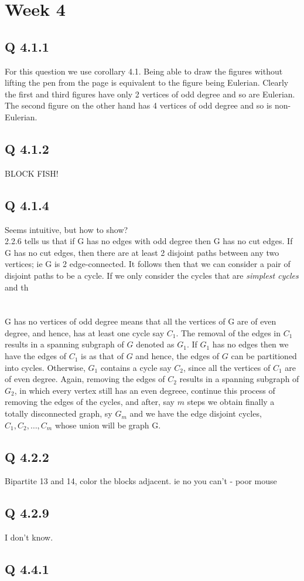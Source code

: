 

\chapter[Week 4]{Week 4}

\section{Q 4.1.1}
For this question we use corollary 4.1. Being able to draw the figures without lifting the pen from the page is equivalent to the figure being Eulerian. Clearly the first and third figures have only 2 vertices of odd degree and so are Eulerian. The second figure on the other hand has 4 vertices of odd degree and so is non-Eulerian.

\section{Q 4.1.2}
BLOCK FISH!

\section{Q 4.1.4}
Seems intuitive, but how to show?\\
2.2.6 tells us that if G has no edges with odd degree then G has no cut edges. If G has no cut edges, then there are at least 2 disjoint paths between any two vertices; ie G is 2 edge-connected. It follows then that we can consider a pair of disjoint paths to be a cycle. If we only consider the cycles that are \emph{simplest cycles} and th\\
\\
\\
G has no vertices of odd degree means that all the vertices of G are of even degree, and hence, has at least one cycle say $C_1$. The removal of the edges in $C_1$ results in a spanning subgraph of $G$ denoted as $G_1$. If $G_1$ has no edges then we have the edges of $C_1$ is as that of $G$ and hence, the edges of $G$ can be partitioned into cycles. Otherwise, $G_1$ contains a cycle say $C_2$, since all the vertices of $C_1$ are of even degree. Again, removing the edges of $C_2$ results in a spanning subgraph of $G_2$, in which every vertex still has an even degreee, continue this process of removing the edges of the cycles, and after, say $m$ steps we obtain finally a totally disconnected graph, sy $G_m$ and we have the edge disjoint cycles, $C_1,C_2,\dots,C_m$ whose union will be graph G.\\

\section{Q 4.2.2}
Bipartite 13 and 14, color the blocks adjacent. ie no you can't - poor mouse


\section{Q 4.2.9}
I don't know.

\section{Q 4.4.1}

